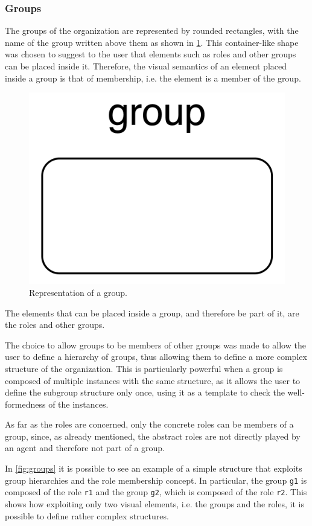 \subsubsection{Groups}
The groups of the organization are represented by rounded rectangles, with the name of the group written above them as shown in \cref{fig:group}.
This container-like shape was chosen to suggest to the user that elements such as roles and other groups can be placed inside it.
Therefore, the visual semantics of an element placed inside a group is that of membership, i.e. the element is a member of the group.

\begin{figure}[H]
    \centering
    \includegraphics[width=0.3\linewidth]{images/visual-language/group.png}
    \caption{Representation of a group.}
    \label{fig:group}
\end{figure}

The elements that can be placed inside a group, and therefore be part of it, are the roles and other groups.

The choice to allow groups to be members of other groups was made to allow the user to define a hierarchy of groups, thus allowing them to define a more complex structure of the organization.
This is particularly powerful when a group is composed of multiple instances with the same structure, as it allows the user to define the subgroup structure only once, using it as a template to check the well-formedness of the instances.

As far as the roles are concerned, only the concrete roles can be members of a group, since, as already mentioned, the abstract roles are not directly played by an agent and therefore not part of a group.

In \cref{fig:groups} it is possible to see an example of a simple structure that exploits group hierarchies and the role membership concept.
In particular, the group \texttt{g1} is composed of the role \texttt{r1} and the group \texttt{g2}, which is composed of the role \texttt{r2}.
This shows how exploiting only two visual elements, i.e. the groups and the roles, it is possible to define rather complex structures.

